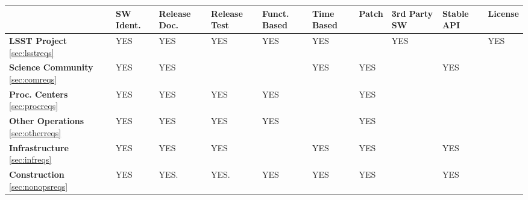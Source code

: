 \setlength\LTleft{-0.4in}
\setlength\LTright{-0.5in}
\begin{longtable}{p{2.4cm}p{1.2cm}p{1.4cm}p{1.4cm}p{1.3cm}p{1.3cm}p{1.3cm}p{1.7cm}p{1.3cm}p{1.3cm}}\hline
&
\textbf{SW Ident.}&\textbf{Release Doc.}&\textbf{Release Test}&\textbf{Funct. Based}&\textbf{Time Based}&\textbf{Patch}&\textbf{3rd Party SW}&\textbf{Stable API} &\textbf{License}\\ \hline
\textbf{LSST Project} \ref{sec:lsstreqs}&
YES                     & YES                         & YES                         &  YES                         &  YES                      &                     & YES                          &                            & YES   \\ \hline
\textbf{Science Community} \ref{sec:comreqs}&
YES                     & YES                         &                                 &                                   &  YES                     & YES             &                                 &  YES                    &            \\ \hline
\textbf{Proc. Centers} \ref{sec:procreqs}&
YES                     & YES                         & YES                         & YES                           &                              & YES             &                                  &                             &            \\ \hline
\textbf{Other Operations} \ref{sec:otherreqs}&
YES                     & YES                         & YES                         & YES                           &                              & YES             &                                  &                             &            \\ \hline
\textbf{Infrastructure} \ref{sec:infreqs}&
YES                     & YES                         & YES                         &                                   &  YES                     & YES             &                                  &  YES                    &            \\ \hline
\textbf{Construction} \ref{sec:nonopsreqs}&
YES                     & YES.                        & YES.                       & YES                           &  YES                     & YES             &                                  &  YES                    &            \\ \hline
\hline
\end{longtable}
\setlength\LTleft{0in}
\setlength\LTright{0in}


